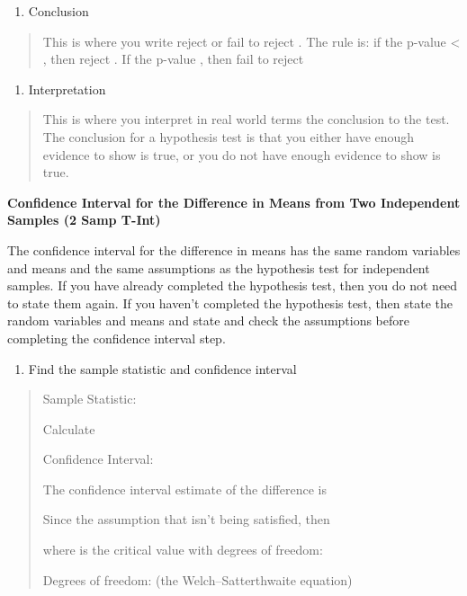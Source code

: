 \documentclass[]{book}
\providecommand{\tightlist}{%
  \setlength{\itemsep}{0pt}\setlength{\parskip}{0pt}}
\begin{document}
\begin{enumerate}
\def\labelenumi{\arabic{enumi}.}
\setcounter{enumi}{4}
\tightlist
\item
  Conclusion
\end{enumerate}

\begin{quote}
This is where you write reject or fail to reject . The rule is: if the p-value \textless{} , then reject . If the p-value , then fail to reject
\end{quote}

\begin{enumerate}
\def\labelenumi{\arabic{enumi}.}
\setcounter{enumi}{5}
\tightlist
\item
  Interpretation
\end{enumerate}

\begin{quote}
This is where you interpret in real world terms the conclusion to the test. The conclusion for a hypothesis test is that you either have enough evidence to show is true, or you do not have enough evidence to show is true.
\end{quote}

\textbf{Confidence Interval for the Difference in Means from Two Independent Samples (2 Samp T-Int)}

The confidence interval for the difference in means has the same random variables and means and the same assumptions as the hypothesis test for independent samples. If you have already completed the hypothesis test, then you do not need to state them again. If you haven't completed the hypothesis test, then state the random variables and means and state and check the assumptions before completing the confidence interval step.

\begin{enumerate}
\def\labelenumi{\arabic{enumi}.}
\tightlist
\item
  Find the sample statistic and confidence interval
\end{enumerate}

\begin{quote}
Sample Statistic:

Calculate

Confidence Interval:

The confidence interval estimate of the difference is

Since the assumption that isn't being satisfied, then

where is the critical value with degrees of freedom:

Degrees of freedom: (the Welch--Satterthwaite equation)
\end{quote}
\end{document}
